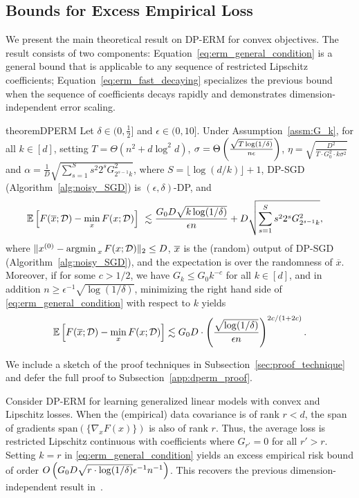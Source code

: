\subsection{Bounds for Excess Empirical Loss}
We present the main theoretical result on DP-ERM for convex objectives. 
The result consists of two components:
Equation~\eqref{eq:erm_general_condition} is a general bound that is applicable to any sequence of restricted Lipschitz coefficients;
Equation~\eqref{eq:erm_fast_decaying} specializes the previous bound when the sequence of coefficients decays rapidly and demonstrates dimension-independent error scaling.
\begin{theo}{theorem}{DPERM}
\label{thm:DPERM}
Let $ \delta \in (0, \frac{1}{2}]$ and $\epsilon\in(0,10]$.
Under Assumption~\ref{assm:G_k}, for all $k \in [d]$, 
setting 
$T=\Theta(n^2 + d \log^2 d)$, $\sigma=\Theta \left( \frac{\sqrt{T\log(1/\delta)}}{n\epsilon} \right)$, $\eta=\sqrt{\frac{D^{2}}{T\cdot G_{0}^{2}\cdot k\sigma^{2}}}$
and $\alpha=\frac{1}{D}\sqrt{\sum_{s=1}^S s^2 2^{s}G_{2^{s-1}k}^{2}}$, where $S = \lfloor \log (d / k) \rfloor + 1$, DP-SGD (Algorithm~\ref{alg:noisy_SGD}) is $(\epsilon,\delta)$-DP, and
\begin{align}
\label{eq:erm_general_condition}
\mathbb{E} \left[  F(\overline{x};\mathcal D)-  \min_x F(x;\mathcal D) \right] &~ \lesssim \frac{G_{0}D\sqrt{k\log(1/\delta)}}{\epsilon n}+D\sqrt{\sum_{s=1}^{S}s^2 2^{s}G_{2^{s-1}k}^{2}},
\end{align}
where $\|x^{(0)}- \mathop{\mathrm{argmin\,}}_x F(x; \mathcal D) \|_2 \le D$, $\overline{x}$ is the (random) output of DP-SGD (Algorithm~\ref{alg:noisy_SGD}), and the expectation is over the randomness of $\overline{x}$.
Moreover, if for some $c>1/2$, we have $G_k\leq G_0 k^{-c}$ for all $k \in [d]$, and in addition $ n\geq \epsilon^{-1} \sqrt{\log(1/\delta)}$,
minimizing the right hand side of \eqref{eq:erm_general_condition} with respect to $k$ yields
\begin{align}
\label{eq:erm_fast_decaying}
\mathbb{E} \left[  F(\overline{x};\mathcal D)-  \min_x F(x;\mathcal D) \right] \lesssim G_{0}D \cdot \left( 
        \frac{\sqrt{\log(1/\delta)}}{\epsilon n}
    \right)^{2c/(1+2c)
}.
\end{align}
\end{theo}
We include a sketch of the proof techniques in Subsection~\ref{sec:proof_technique} and defer the full proof to Subsection~\ref{app:dperm_proof}.
\begin{remark}
Consider DP-ERM for learning generalized linear models with convex and Lipschitz losses.
When the (empirical) data covariance is of rank $r < d$, the span of gradients $\text{span}(\{ \nabla_x F(x) \})$ is also of rank $r$. 
Thus, the average loss is restricted Lipschitz continuous with coefficients where $G_{r'} = 0$ for all $r' > r$. 
Setting $k = r$ in \eqref{eq:erm_general_condition} yields an excess empirical risk bound of order $O\left( {G_{0}D\sqrt{ r \cdot\log(1/\delta)}} \epsilon^{-1} n^{-1} \right)$.
This recovers the previous dimension-independent result in~\cite{song2021evading}.
\end{remark}

